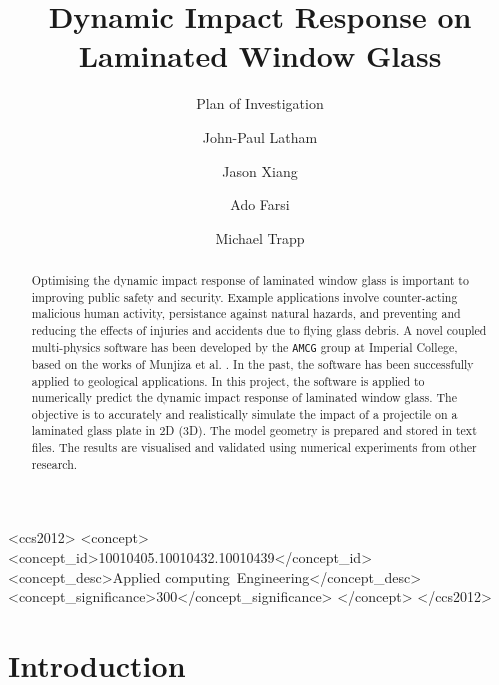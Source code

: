 \documentclass[format=acmsmall, 12pt, screen=true, review=false]{acmart}
\title[Dynamic Impact Response of LG]{Dynamic Impact Response on Laminated Window Glass}
\subtitle{Plan of Investigation}
\author{John-Paul Latham}
\author{Jason Xiang}
\author{Ado Farsi}
\author{Michael Trapp}
\begin{document}
\begin{abstract}
  Optimising the dynamic impact response of laminated window glass is important to improving public safety and security. Example applications involve counter-acting malicious human activity, persistance against natural hazards, and preventing and reducing the effects of injuries and accidents due to flying glass debris. A novel coupled multi-physics software has been developed by the \texttt{AMCG} group at Imperial College, based on the works of Munjiza et al. \cite{Mun95, Mun99, Mun12, Mun13}. In the past, the software has been successfully applied to geological applications. In this project, the software is applied to numerically predict the dynamic impact response of laminated window glass. The objective is to accurately and realistically simulate the impact of a projectile on a laminated glass plate in 2D (3D). The model geometry is prepared and stored in text files. The results are visualised and validated using numerical experiments from other research.
\end{abstract}

\begin{CCSXML}
<ccs2012>
<concept>
<concept_id>10010405.10010432.10010439</concept_id>
<concept_desc>Applied computing~Engineering</concept_desc>
<concept_significance>300</concept_significance>
</concept>
</ccs2012>
\end{CCSXML}


\maketitle

\section{Introduction}
\end{document}
